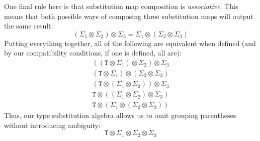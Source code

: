 \documentclass[../generics]{subfiles}
\begin{document}
One final rule here is that substitution map composition is \emph{associative}. This means that both possible ways of composing three substitution maps will output the same result:
\[
(\Sigma_1\otimes\Sigma_2)\otimes\Sigma_3=\Sigma_1\otimes(\Sigma_2\otimes\Sigma_3)
\]
Putting everything together, all of the following are equivalent when defined (and by our compatibility conditions, if one is defined, all are):
\begin{gather*}
((\texttt{T}\otimes\Sigma_1)\otimes\Sigma_2)\otimes\Sigma_3\\
(\texttt{T}\otimes\Sigma_1)\otimes(\Sigma_2\otimes\Sigma_3)\\
(\texttt{T}\otimes(\Sigma_1\otimes\Sigma_2))\otimes\Sigma_3\\
\texttt{T}\otimes((\Sigma_1\otimes\Sigma_2)\otimes\Sigma_3)\\
\texttt{T}\otimes(\Sigma_1\otimes(\Sigma_2\otimes\Sigma_3))
\end{gather*}
Thus, our type substitution algebra allows us to omit grouping parentheses without introducing ambiguity:
\[\texttt{T}\otimes\Sigma_1\otimes\Sigma_2\otimes\Sigma_3\]
\end{document}
